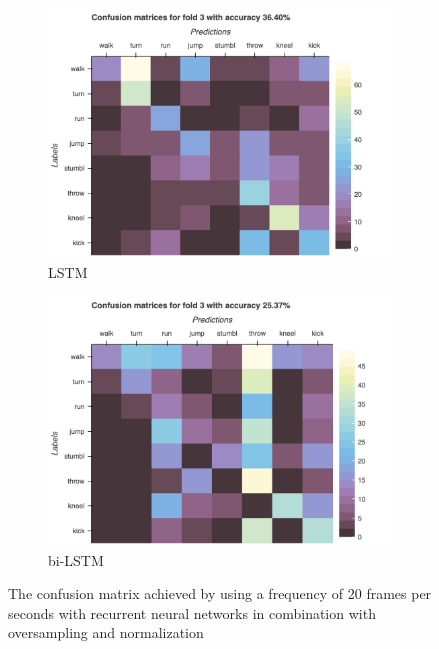 \begin{figure}[H]
\begin{subfigure}[b]{0.49\textwidth}
				\includegraphics[width=\textwidth]{img/LSTM-Confusion_matrix_drop.png}
				\caption{LSTM}
			\end{subfigure}
			\hfill
			\begin{subfigure}[b]{0.49\textwidth}
				\centering
				\includegraphics[width=\textwidth]{img/bi-LSTM-Confusion_matrix_drop.png}
				\caption{bi-LSTM}
			\end{subfigure}
			\caption{The confusion matrix achieved by using a frequency of 20 frames per seconds with recurrent neural networks in combination with oversampling and normalization}
			\label{fig:freq_5_seq}
		\end{figure}
